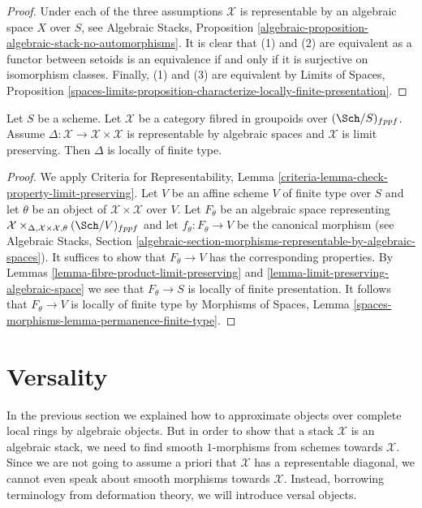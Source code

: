 \begin{proof}
Under each of the three assumptions $\mathcal{X}$ is representable
by an algebraic space $X$ over $S$, see Algebraic Stacks, Proposition
\ref{algebraic-proposition-algebraic-stack-no-automorphisms}.
It is clear that (1) and (2) are equivalent as a functor between
setoids is an equivalence if and only if it is surjective on isomorphism
classes. Finally, (1) and (3) are equivalent by
Limits of Spaces, Proposition
\ref{spaces-limits-proposition-characterize-locally-finite-presentation}.
\end{proof}

\begin{lemma}
\label{lemma-diagonal}
Let $S$ be a scheme. Let $\mathcal{X}$ be a category fibred
in groupoids over $(\Sch/S)_{fppf}$. Assume
$\Delta : \mathcal{X} \to \mathcal{X} \times \mathcal{X}$ is
representable by algebraic spaces and $\mathcal{X}$ is limit preserving.
Then $\Delta$ is locally of finite type.
\end{lemma}

\begin{proof}
We apply Criteria for Representability, Lemma
\ref{criteria-lemma-check-property-limit-preserving}.
Let $V$ be an affine scheme $V$ of finite type over $S$
and let $\theta$ be an object of $\mathcal{X} \times \mathcal{X}$
over $V$. Let $F_\theta$ be an algebraic space representing
$\mathcal{X} \times_{\Delta, \mathcal{X} \times \mathcal{X}, \theta}
(\Sch/V)_{fppf}$ and let $f_\theta : F_\theta \to V$ be the canonical morphism
(see Algebraic Stacks, Section
\ref{algebraic-section-morphisms-representable-by-algebraic-spaces}).
It suffices to show that
$F_\theta \to V$ has the corresponding properties. By
Lemmas \ref{lemma-fibre-product-limit-preserving} and
\ref{lemma-limit-preserving-algebraic-space}
we see that $F_\theta \to S$ is locally of finite presentation.
It follows that $F_\theta \to V$ is locally of finite type
by Morphisms of Spaces, Lemma
\ref{spaces-morphisms-lemma-permanence-finite-type}.
\end{proof}






\section{Versality}
\label{section-versality}

\noindent
In the previous section we explained how to approximate objects over
complete local rings by algebraic objects. But in order to show that
a stack $\mathcal{X}$ is an algebraic stack, we need to find smooth
$1$-morphisms from schemes towards $\mathcal{X}$. Since we are not going
to assume a priori that $\mathcal{X}$ has a representable diagonal, we
cannot even speak about smooth morphisms towards $\mathcal{X}$. Instead,
borrowing terminology from deformation theory, we will introduce versal
objects.

